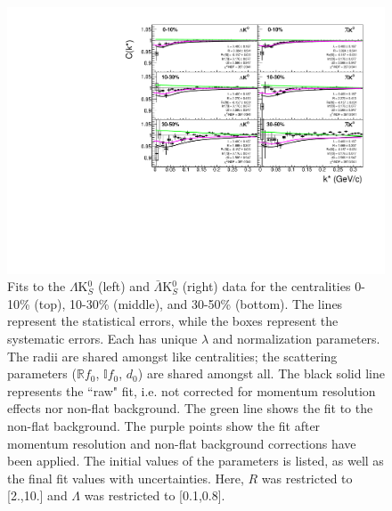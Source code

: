 \documentclass[../AnalysisNoteJBuxton.tex]{subfiles}
\begin{document}
\begin{figure}[h]
  \centering
  \includegraphics[width=\textwidth]{7_ResultsAndDiscussion/Figures/canKStarCfwFitsLamK0wConj_0010_1030_3050_MomResCrctn_NonFlatBgdCrctn.pdf}
  \caption[$\Lambda$K$^{0}_{S}$($\bar{\Lambda}$K$^{0}_{S}$) Fits]{Fits to the $\Lambda$K$^{0}_{S}$ (left) and $\bar{\Lambda}$K$^{0}_{S}$ (right) data for the centralities 0-10\% (top), 10-30\% (middle), and 30-50\% (bottom).
The lines represent the statistical errors, while the boxes represent the systematic errors.
Each has unique $\lambda$ and normalization parameters.
The radii are shared amongst like centralities; the scattering parameters ($\mathbb{R}f_{0}$, $\mathbb{I}f_{0}$, $d_{0}$) are shared amongst all.
The black solid line represents the ``raw" fit, i.e. not corrected for momentum resolution effects nor non-flat background.  
The green line shows the fit to the non-flat background.
The purple points show the fit after momentum resolution and non-flat background corrections have been applied.
The initial values of the parameters is listed, as well as the final fit values with uncertainties.
Here, $R$ was restricted to [2.,10.] and $\Lambda$ was restricted to [0.1,0.8].}
  \label{fig:LamK0wConjFits}
\end{figure}
\end{document}
